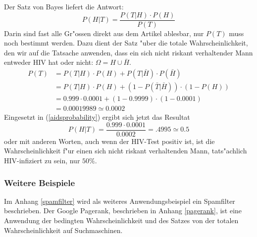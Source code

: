 Der Satz von Bayes liefert die Antwort:
\begin{equation}
P(H|T)=\frac{P(T|H)\cdot P(H)}{P(T)}
\label{aidsprobability}
\end{equation}
Darin sind fast alle Gr"ossen direkt aus dem Artikel ablesbar, nur $P(T)$ muss
noch bestimmt werden. Dazu dient der Satz "uber die totale Wahrscheinlichkeit,
den wir auf die Tatsache anwenden, dass ein sich nicht riskant verhaltender
Mann entweder HIV hat oder nicht: $\Omega=H\cup \bar H$.
\begin{align*}
P(T)
&=P(T|H)\cdot P(H)+P(T|\bar H)\cdot P(\bar H)\\
&=P(T|H)\cdot P(H)+(1-P(\bar T|\bar H))\cdot (1 - P(H))\\
&=0.999\cdot 0.0001+(1-0.9999)\cdot(1-0.0001)\\
&=0.00019989\simeq 0.0002
\end{align*}
Eingesetzt in (\ref{aidsprobability}) ergibt sich jetzt das Resultat
\[
P(H|T)=\frac{0.999\cdot 0.0001}{0.0002}=.4995\simeq 0.5
\]
oder mit anderen Worten, auch wenn der HIV-Test positiv ist, ist
die Wahrscheinlichkeit f"ur einen sich nicht riskant verhaltenden Mann,
tats"achlich HIV-infiziert zu sein, nur $50\%$.

\subsubsection{Weitere Beispiele}
Im Anhang \ref{spamfilter} wird als weiteres Anwendungsbeispiel ein Spamfilter
beschrieben. Der Google Pagerank, beschrieben in Anhang \ref{pagerank},
ist eine Anwendung der bedingten Wahrscheinlichkeit und des Satzes von
der totalen Wahrscheinlichkeit auf Suchmaschinen.

